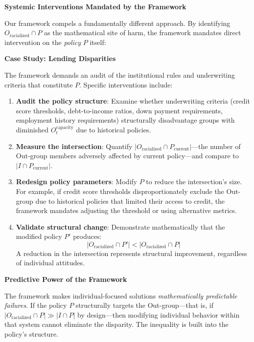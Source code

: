 \documentclass[12pt]{article}
\begin{document}
\textbf{Systemic Interventions Mandated by the Framework}

Our framework compels a fundamentally different approach. By identifying $O_{\text{racialized}} \cap P$ as the mathematical site of harm, the framework mandates direct intervention on the \textit{policy} $P$ itself:

\textbf{Case Study: Lending Disparities}

The framework demands an audit of the institutional rules and underwriting criteria that constitute $P$. Specific interventions include:
\begin{enumerate}
    \item \textbf{Audit the policy structure}: Examine whether underwriting criteria (credit score thresholds, debt-to-income ratios, down payment requirements, employment history requirements) structurally disadvantage groups with diminished $O_t^{\text{capacity}}$ due to historical policies.
    
    \item \textbf{Measure the intersection}: Quantify $|O_{\text{racialized}} \cap P_{\text{current}}|$---the number of Out-group members adversely affected by current policy---and compare to $|I \cap P_{\text{current}}|$.
    
    \item \textbf{Redesign policy parameters}: Modify $P$ to reduce the intersection's size. For example, if credit score thresholds disproportionately exclude the Out-group due to historical policies that limited their access to credit, the framework mandates adjusting the threshold or using alternative metrics.
    
    \item \textbf{Validate structural change}: Demonstrate mathematically that the modified policy $P'$ produces:
    \[
    |O_{\text{racialized}} \cap P'| < |O_{\text{racialized}} \cap P|
    \]
    A reduction in the intersection represents structural improvement, regardless of individual attitudes.
\end{enumerate}

\textbf{Predictive Power of the Framework}

The framework makes individual-focused solutions \textit{mathematically predictable failures}. If the policy $P$ structurally targets the Out-group---that is, if $|O_{\text{racialized}} \cap P| \gg |I \cap P|$ by design---then modifying individual behavior within that system cannot eliminate the disparity. The inequality is built into the policy's structure.
\end{document}
